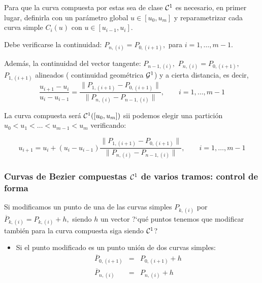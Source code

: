 \documentclass[twoside]{report}
\begin{document}
Para que la curva compuesta por estas sea de clase ${\cal C}^1$ es necesario, en primer lugar, definirla con un par\'{a}metro
global $u\in [u_0,u_m]$ y reparametrizar cada curva simple $C_i(u)$ con $u\in [u_{i-1},u_i]$.

Debe verificarse la continuidad: $P_{n, (i)}=P_{0,(i+1)},$ para $i=1,\ldots,m-1$.

Adem\'{a}s, la continuidad del vector tangente: $P_{n-1, (i)},$ $P_{n, (i)}=P_{0,(i+1)},$ $P_{1,(i+1)}$ alineados ( continuidad geom\'{e}trica ${\cal G}^1$) y a cierta distancia, es decir,
$$\frac{u_{i+1}-u_i}{u_i-u_{i-1}} = \frac{\parallel P_{1,(i+1)}-P_{0,(i+1)}\parallel}{\parallel P_{n, (i)}-P_{n-1,(i)} \parallel},\quad \quad i=1,\ldots,m-1$$

\vspace{0.2cm}

La curva compuesta ser\'{a} ${\cal C}^1([u_0,u_m])$ sii podemos elegir una partici\'{o}n $u_0<u_1<\ldots<u_{m-1}<u_m$ verificando:

$$u_{i+1}=u_i+(u_i-u_{i-1}) \frac{\parallel P_{1,(i+1)}-P_{0,(i+1)}\parallel}{\parallel P_{n, (i)}-P_{n-1,(i)}
\parallel},\quad \quad i=1,\ldots,m-1$$

%

\subsubsection{Curvas de Bezier compuestas ${\cal C}^1$ de varios tramos: control de forma}

Si modificamos un punto de una de las curvas simples $P_{k, (i)}$ por $\overline{P}_{k, (i)}=P_{k, (i)}+h,$ siendo $h$ un vector ?`qu\'{e} puntos tenemos que modificar tambi\'{e}n para la curva compuesta siga siendo ${\cal C}^1$?

\begin{itemize}
\item Si el punto modificado es un punto uni\'{o}n de dos curvas simples:
$$\begin{array}{rcl} \overline{P}_{0, (i+1)}&=&P_{0, (i+1)}+h\\ \overline{P}_{n, (i)}&=&P_{n, (i)}+h\\ \end{array}$$
\end{itemize}
\end{document}
